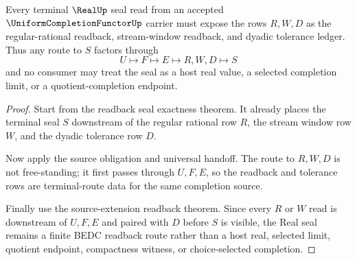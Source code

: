 \begin{theorem}
\label{thm:uniformcompletionfunctor-readback-tolerance-terminal-route}
Every terminal $\RealUp$ seal read from an accepted $\UniformCompletionFunctorUp$ carrier must expose the rows $R,W,D$ as the regular-rational readback, stream-window readback, and dyadic tolerance ledger. Thus any route to $S$ factors through
$$
U \longmapsto F \longmapsto E \longmapsto R,W,D \longmapsto S
$$
and no consumer may treat the seal as a host real value, a selected completion limit, or a quotient-completion endpoint.
\end{theorem}
\begin{proof}
Start from the readback seal exactness theorem. It already places the terminal seal $S$ downstream of the regular rational row $R$, the stream window row $W$, and the dyadic tolerance row $D$.

Now apply the source obligation and universal handoff. The route to $R,W,D$ is not free-standing; it first passes through $U,F,E$, so the readback and tolerance rows are terminal-route data for the same completion source.

Finally use the source-extension readback theorem. Since every $R$ or $W$ read is downstream of $U,F,E$ and paired with $D$ before $S$ is visible, the Real seal remains a finite BEDC readback route rather than a host real, selected limit, quotient endpoint, compactness witness, or choice-selected completion.
\end{proof}

